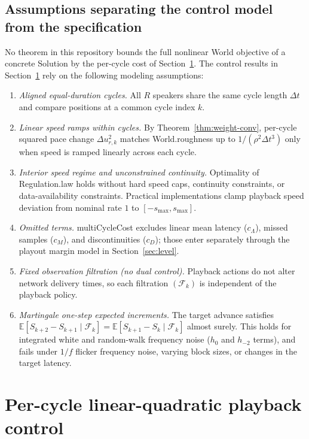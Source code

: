 \documentclass[11pt,a4paper]{article}
\DeclareRobustCommand{\lean}[1]{{\ttfamily\def\_{\textunderscore\allowbreak}#1}}
\newcommand{\E}{\mathbb{E}}
\theoremstyle{definition}
\begin{document}
\subsection{Assumptions separating the control model from the specification}

No theorem in this repository bounds the full nonlinear \lean{World} objective
of a concrete \lean{Solution} by the per-cycle cost of
Section~\ref{sec:control}. The control results in Section~\ref{sec:control}
rely on the following modeling assumptions:
\begin{enumerate}
\item \emph{Aligned equal-duration cycles.} All $R$ speakers share the same
  cycle length $\Delta t$ and compare positions at a common cycle index $k$.
\item \emph{Linear speed ramps within cycles.} By Theorem~\ref{thm:weight-conv},
  per-cycle squared pace change $\Delta u_{r,k}^2$ matches
  \lean{World.roughness} up to $1/(\rho^2\Delta t^3)$ only when speed is ramped
  linearly across each cycle.
\item \emph{Interior speed regime and unconstrained continuity.} Optimality of
  \lean{Regulation.law} holds without hard speed caps, continuity constraints,
  or data-availability constraints. Practical implementations clamp playback
  speed deviation from nominal rate $1$ to $[-s_{\max}, s_{\max}]$.
\item \emph{Omitted terms.} \lean{multiCycleCost} excludes linear mean latency
  ($c_\Lambda$), missed samples ($c_M$), and discontinuities ($c_D$); those
  enter separately through the playout margin model in Section~\ref{sec:level}.
\item \emph{Fixed observation filtration (no dual control).} Playback actions
  do not alter network delivery times, so each filtration $(\mathcal{F}_k)$ is
  independent of the playback policy.
\item \emph{Martingale one-step expected increments.} The target advance
  satisfies $\E[S_{k+2} - S_{k+1} \mid \mathcal{F}_k] =
  \E[S_{k+1} - S_k \mid \mathcal{F}_k]$ almost surely. This holds for
  integrated white and random-walk frequency noise ($h_0$ and $h_{-2}$ terms),
  and fails under $1/f$ flicker frequency noise, varying block sizes, or changes
  in the target latency.
\end{enumerate}

\section{Per-cycle linear-quadratic playback control}
\label{sec:control}
\end{document}
